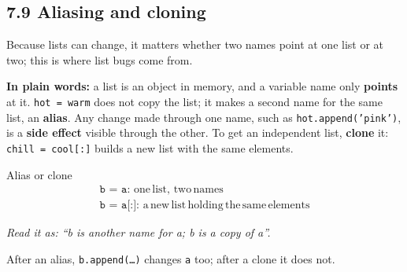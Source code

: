 \documentclass[11pt]{article}
\begin{document}
\begin{keepsection}
\section{7.9 Aliasing and cloning}

Because lists can change, it matters whether two names point at one list or at two; this is where list bugs come from.

\begin{plainbox}\textbf{In plain words:} a list is an object in memory, and a variable name only \textbf{points} at it. \texttt{hot = warm} does not copy the list; it makes a second name for the same list, an \textbf{alias}. Any change made through one name, such as \texttt{hot.append('pink')}, is a \textbf{side effect} visible through the other. To get an independent list, \textbf{clone} it: \texttt{chill = cool[:]} builds a new list with the same elements.\end{plainbox}

\begin{equationcard}{Alias or clone}
\[ \begin{gathered} \texttt{b = a}:\, \text{one}\, \text{list},\, \text{two}\, \text{names} \\ \texttt{b = a[:]}:\, \mathrm{a}\, \text{new}\, \text{list}\, \text{holding}\, \text{the}\, \text{same}\, \text{elements} \end{gathered} \]
{\small \emph{Read it as: “b is another name for a; b is a copy of a”.}\par  After an alias, \texttt{b.append(…)} changes \texttt{a} too; after a clone it does not.}
\end{equationcard}


\end{keepsection}
\end{document}
